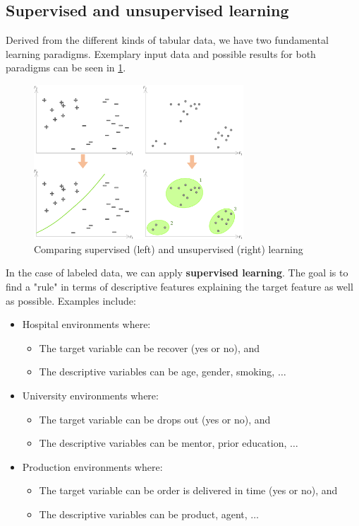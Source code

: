 \subsection{Supervised and unsupervised learning}
Derived from the different kinds of tabular data, we have two fundamental learning paradigms. Exemplary input data and possible results for both paradigms can be seen in \ref{fig:1_sv_vs_usv}.

\begin{figure}[H]
  \centering
  \includegraphics[width=0.7\textwidth]{assets/basics/SV_vs_US.png}
  \caption{Comparing supervised (left) and unsupervised (right) learning}
  \label{fig:1_sv_vs_usv}
\end{figure}

In the case of labeled data, we can apply \textbf{supervised learning}. The goal is to find a "rule" in terms of descriptive features explaining the target feature as well as possible. Examples include:
\begin{itemize}
  \item Hospital environments where:
  \begin{itemize}
    \item The target variable can be {\color{ForestGreen}recover (yes or no)}, and 
    \item The descriptive variables can be {\color{ForestGreen}age, gender, smoking, $\dots$}
  \end{itemize}
  \item University environments where:
  \begin{itemize}
    \item The target variable can be {\color{ForestGreen}drops out (yes or no)}, and 
    \item The descriptive variables can be {\color{ForestGreen}mentor, prior education, $\dots$}
  \end{itemize}
  \item Production environments where:
  \begin{itemize}
    \item The target variable can be {\color{ForestGreen}order is delivered in time (yes or no)}, and 
    \item The descriptive variables can be {\color{ForestGreen}product, agent, $\dots$}
  \end{itemize}
\end{itemize}

